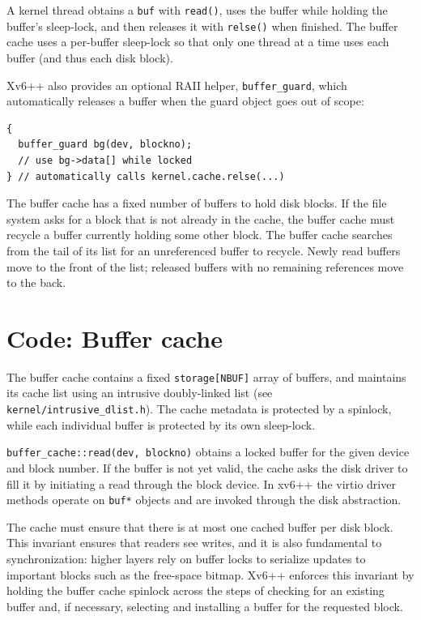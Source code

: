 A kernel thread obtains a \lstinline{buf} with \lstinline{read()},
uses the buffer while holding the buffer's sleep-lock, and then releases it
with \lstinline{relse()} when finished.
The buffer cache uses a per-buffer sleep-lock so that only one thread at a time
uses each buffer (and thus each disk block).

Xv6++ also provides an optional RAII helper,
\lstinline{buffer_guard},
which automatically releases a buffer when the guard object goes out of scope:

\begin{lstlisting}
{
  buffer_guard bg(dev, blockno);
  // use bg->data[] while locked
} // automatically calls kernel.cache.relse(...)
\end{lstlisting}

The buffer cache has a fixed number of buffers to hold disk blocks.
If the file system asks for a block that is not already in the cache,
the buffer cache must recycle a buffer currently holding some other block.
The buffer cache searches from the tail of its list for an unreferenced buffer
to recycle. Newly read buffers move to the front of the list; released buffers
with no remaining references move to the back.

\section{Code: Buffer cache}

The buffer cache contains a fixed \lstinline{storage[NBUF]} array of buffers,
and maintains its cache list using an intrusive doubly-linked list
(see \texttt{kernel/intrusive\_dlist.h}).
The cache metadata is protected by a spinlock, while each individual buffer
is protected by its own sleep-lock.

\lstinline{buffer_cache::read(dev, blockno)} obtains a locked buffer for the
given device and block number. If the buffer is not yet valid, the cache asks
the disk driver to fill it by initiating a read through the block device.
In xv6++ the virtio driver methods operate on
\lstinline{buf*}
objects and are invoked through the disk abstraction.

The cache must ensure that there is at most one cached buffer per disk block.
This invariant ensures that readers see writes, and it is also fundamental to
synchronization: higher layers rely on buffer locks to serialize updates to
important blocks such as the free-space bitmap.
Xv6++ enforces this invariant by holding the buffer cache spinlock across the
steps of checking for an existing buffer and, if necessary, selecting and
installing a buffer for the requested block.

